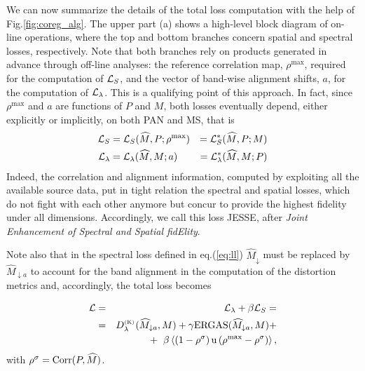 \documentclass[journal]{IEEEtran}
\newcommand{\hM} {\widehat{M}}
\newcommand{\LL}{{\cal L}}
\newcommand{\DL} {D^{_{\rm (K)}}_\lambda}
\begin{document}
We can now summarize the details of the total loss computation with the help of Fig.\ref{fig:coreg_alg}.
The upper part (a) shows a high-level block diagram of on-line operations,
where the top and bottom branches concern spatial and spectral losses, respectively.
Note that both branches rely on products generated in advance through off-line analyses:
the reference correlation map, $\rho^{\max}$, required for the computation of $\LL_S$, and
the vector of band-wise alignment shifts, $a$,         for the computation of $\LL_\lambda$.
This is a qualifying point of this approach.
In fact, since $\rho^{\max}$ and $a$ are functions of $P$ and $M$,
both losses eventually depend, either explicitly or implicitly, on both PAN and MS, that is
\begin{eqnarray}
    \LL_S       & = \LL_S(\hM, P; \rho^{\max})             & = \LL_S^*(\hM, P; M) \\
    \LL_\lambda & = \LL_\lambda(\hM, M; a) \rule{4mm}{0mm} & = \LL_\lambda^*(\hM, M; P)
\end{eqnarray}
Indeed, the correlation and alignment information, computed by exploiting all the available source data,
put in tight relation the spectral and spatial losses, which do not fight with each other anymore
but concur to provide the highest fidelity under all dimensions.
Accordingly, we call this loss JESSE, after {\em Joint Enhancement of Spectral and Spatial fidElity}.

Note also that in the spectral loss defined in eq.(\ref{eq:ll}) $\hM_{\downarrow}$ must be replaced by $\hM_{\downarrow a}$
to account for the band alignment in the computation of the distortion metrics and, accordingly, the total loss becomes


\begin{eqnarray}
    \LL & = & \LL_\lambda + \beta \LL_S = \nonumber \\
        & = & {\DL}(\hM_{\downarrow a}, M) + \gamma {\rm ERGAS}(\hM_{\downarrow a}, M) + \nonumber \\
        &   & + \;\; \beta \left\langle \left(1-\rho^{\sigma}\right) {\rm u}\left(\rho^{\max}-\rho^{\sigma}\right) \right\rangle,
    \label{eq:total}
\end{eqnarray}
with $ \rho^\sigma = {\rm Corr}(P,\hM)$.
\end{document}
